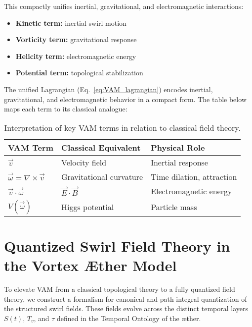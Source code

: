 \documentclass[preprint]{revtex4-2}
\begin{document}
        This compactly unifies inertial, gravitational, and electromagnetic interactions:
         \begin{itemize}
        \item \textbf{Kinetic term:} inertial swirl motion
        \item \textbf{Vorticity term:} gravitational response
        \item \textbf{Helicity term:} electromagnetic energy
        \item \textbf{Potential term:} topological stabilization
        \end{itemize}

    The unified Lagrangian (Eq.~\ref{eq:VAM_lagrangian}) encodes inertial, gravitational, and electromagnetic behavior in a compact form. The table below maps each term to its classical analogue:

    \begin{table}[H]
        \centering
        \renewcommand{\arraystretch}{1.3}
        \begin{tabular}{|l|l|l|}
            \hline
            \textbf{VAM Term} & \textbf{Classical Equivalent} & \textbf{Physical Role} \\
            \hline
            \( \vec{v} \) & Velocity field & Inertial response \\
            \( \vec{\omega} = \nabla \times \vec{v} \) & Gravitational curvature & Time dilation, attraction \\
            \( \vec{v} \cdot \vec{\omega} \) & \( \vec{E} \cdot \vec{B} \) & Electromagnetic energy \\
            \( V(\vec{\omega}) \) & Higgs potential & Particle mass \\
            \hline
        \end{tabular}
        \caption{Interpretation of key VAM terms in relation to classical field theory.}
        \label{tab:vam_classical_mapping}
    \end{table}


\section{Quantized Swirl Field Theory in the Vortex \AE{}ther Model}\label{sec:quantized_swirl_field_theory}
    To elevate VAM from a classical topological theory to a fully quantized field theory, we construct a formalism for canonical and path-integral quantization of the structured swirl fields. These fields evolve across the distinct temporal layers \( S(t) \), \( T_v \), and \( \tau \) defined in the Temporal Ontology of the æther.
\end{document}

